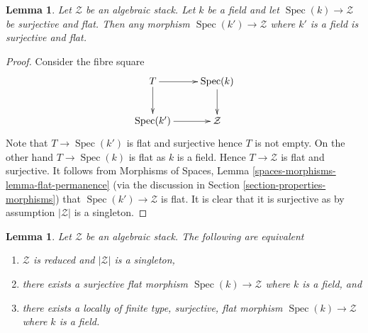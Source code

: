 \documentclass{stacks-project}
\theoremstyle{plain}
\newtheorem{lemma}[subsection]{Lemma}
\theoremstyle{definition}
\theoremstyle{remark}
\numberwithin{equation}{subsection}
\def\Spec{\mathop{\mathrm{Spec}}}
\begin{document}
\begin{lemma}
\label{lemma-flat-cover-by-field}
Let $\mathcal{Z}$ be an algebraic stack. Let $k$ be a field and let
$\Spec(k) \to \mathcal{Z}$ be surjective and flat. Then any
morphism $\Spec(k') \to \mathcal{Z}$ where $k'$ is a field is
surjective and flat.
\end{lemma}

\begin{proof}
Consider the fibre square
$$
\xymatrix{
T \ar[d] \ar[r] & \Spec(k) \ar[d] \\
\Spec(k') \ar[r] & \mathcal{Z}
}
$$
Note that $T \to \Spec(k')$ is flat and surjective hence $T$
is not empty. On the other hand $T \to \Spec(k)$ is flat as
$k$ is a field. Hence $T \to \mathcal{Z}$ is flat and surjective.
It follows from
Morphisms of Spaces, Lemma \ref{spaces-morphisms-lemma-flat-permanence}
(via the discussion in
Section \ref{section-properties-morphisms})
that $\Spec(k') \to \mathcal{Z}$ is flat. It is clear that it
is surjective as by assumption $|\mathcal{Z}|$ is a singleton.
\end{proof}

\begin{lemma}
\label{lemma-unique-point}
Let $\mathcal{Z}$ be an algebraic stack. The following are equivalent
\begin{enumerate}
\item $\mathcal{Z}$ is reduced and $|\mathcal{Z}|$ is a singleton,
\item there exists a surjective flat morphism $\Spec(k) \to \mathcal{Z}$
where $k$ is a field, and
\item there exists a locally of finite type, surjective, flat morphism
$\Spec(k) \to \mathcal{Z}$ where $k$ is a field.
\end{enumerate}
\end{lemma}
\end{document}
